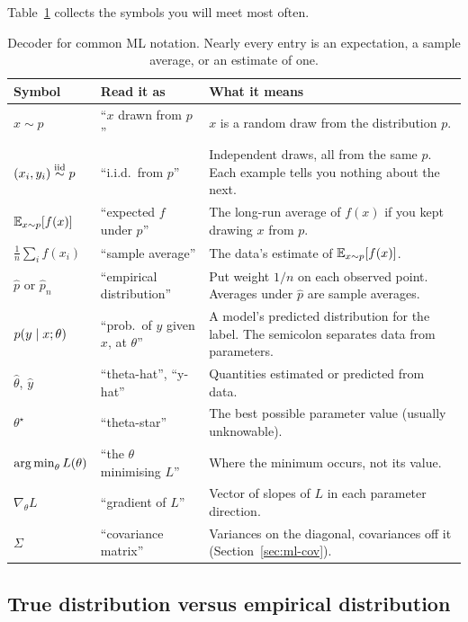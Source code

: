 Table~\ref{tab:ml-decoder} collects the symbols you will meet most often.

\begin{table}[H]
\centering
\small
\renewcommand{\arraystretch}{1.25}
\begin{tabular}{p{3.3cm} p{3.5cm} p{6.4cm}}
\toprule
\textbf{Symbol} & \textbf{Read it as} & \textbf{What it means} \\
\midrule
$x\sim p$ & ``$x$ drawn from $p$'' & $x$ is a random draw from the distribution $p$. \\
$(x_i,y_i)\overset{\text{iid}}{\sim} p$ & ``i.i.d.\ from $p$'' & Independent draws, all from the same $p$. Each example tells you nothing about the next. \\
$\operatorname{\mathbb{E}}_{x\sim p}[f(x)]$ & ``expected $f$ under $p$'' & The long-run average of $f(x)$ if you kept drawing $x$ from $p$. \\
$\frac1n\sum_i f(x_i)$ & ``sample average'' & The data's estimate of $\operatorname{\mathbb{E}}_{x\sim p}[f(x)]$. \\
$\hat p$ or $\hat p_n$ & ``empirical distribution'' & Put weight $1/n$ on each observed point. Averages under $\hat p$ are sample averages. \\
$p(y\mid x;\theta)$ & ``prob.\ of $y$ given $x$, at $\theta$'' & A model's predicted distribution for the label. The semicolon separates data from parameters. \\
$\hat\theta$, $\hat y$ & ``theta-hat'', ``y-hat'' & Quantities estimated or predicted from data. \\
$\theta^\star$ & ``theta-star'' & The best possible parameter value (usually unknowable). \\
$\operatorname*{arg\,min}_\theta L(\theta)$ & ``the $\theta$ minimising $L$'' & Where the minimum occurs, not its value. \\
$\nabla_\theta L$ & ``gradient of $L$'' & Vector of slopes of $L$ in each parameter direction. \\
$\Sigma$ & ``covariance matrix'' & Variances on the diagonal, covariances off it (Section~\ref{sec:ml-cov}). \\
\bottomrule
\end{tabular}
\caption{Decoder for common ML notation. Nearly every entry is an expectation, a sample
average, or an estimate of one.}
\label{tab:ml-decoder}
\end{table}

\subsection{True distribution versus empirical distribution}

